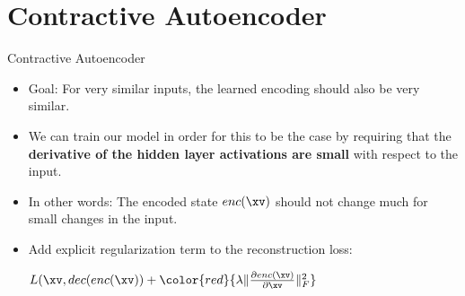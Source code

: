 \documentclass[11pt,compress,t,notes=noshow, xcolor=table]{beamer}
\begin{document}
\section{Contractive Autoencoder}

\begin{frame}[t]{Contractive Autoencoder}
   \begin{itemize}
      \item Goal: For very similar inputs, the learned encoding should also be very similar. 
      \item We can train our model in order for this to be the case by requiring that the \textbf{derivative of the hidden layer activations are small} with respect to the input. 
      \item In other words: The encoded state $enc(\xv)$ should not change much for small changes in the input. 
      \item Add explicit regularization term to the reconstruction loss:\\
           \begin{center}
       $L(\xv, dec(enc(\xv)) + \color{red}{\lambda \Vert \frac{\partial enc(\xv)}{\partial \xv} \Vert^2_F}$ 
   \end{center}
   \end{itemize} 

\end{frame}
\end{document}
